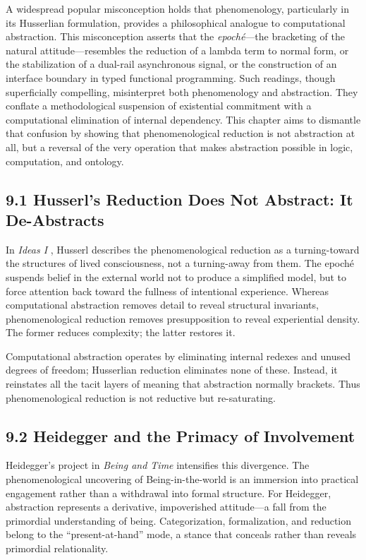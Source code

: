 \documentclass[12pt,letterpaper]{article}
\theoremstyle{remark}
\begin{document}
A widespread popular misconception holds that phenomenology, particularly in its Husserlian formulation, provides a philosophical analogue to computational abstraction. This misconception asserts that the \emph{epoché}—the bracketing of the natural attitude—resembles the reduction of a lambda term to normal form, or the stabilization of a dual-rail asynchronous signal, or the construction of an interface boundary in typed functional programming. Such readings, though superficially compelling, misinterpret both phenomenology and abstraction. They conflate a methodological suspension of existential commitment with a computational elimination of internal dependency. This chapter aims to dismantle that confusion by showing that phenomenological reduction is not abstraction at all, but a reversal of the very operation that makes abstraction possible in logic, computation, and ontology.

\subsection{9.1 Husserl’s Reduction Does Not Abstract: It De-Abstracts}
In \textit{Ideas I} \citep{Husserl1913}, Husserl describes the phenomenological reduction as a turning-toward the structures of lived consciousness, not a turning-away from them. The epoché suspends belief in the external world not to produce a simplified model, but to force attention back toward the fullness of intentional experience. Whereas computational abstraction removes detail to reveal structural invariants, phenomenological reduction removes presupposition to reveal experiential density. The former reduces complexity; the latter restores it.

Computational abstraction operates by eliminating internal redexes and unused degrees of freedom; Husserlian reduction eliminates none of these. Instead, it reinstates all the tacit layers of meaning that abstraction normally brackets. Thus phenomenological reduction is not reductive but re-saturating.

\subsection{9.2 Heidegger and the Primacy of Involvement}
Heidegger’s project in \textit{Being and Time} \citep{Heidegger1927} intensifies this divergence. The phenomenological uncovering of Being-in-the-world is an immersion into practical engagement rather than a withdrawal into formal structure. For Heidegger, abstraction represents a derivative, impoverished attitude—a fall from the primordial understanding of being. Categorization, formalization, and reduction belong to the “present-at-hand” mode, a stance that conceals rather than reveals primordial relationality.
\end{document}
